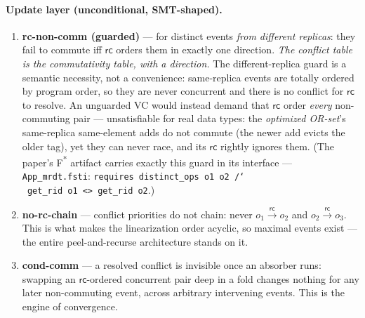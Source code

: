 \documentclass[11pt]{article}
\newcommand{\rc}{\xrightarrow{\mathsf{rc}}}
\newcommand{\lean}[1]{\texttt{#1}}
\begin{document}
\paragraph{Update layer (unconditional, SMT-shaped).}
\begin{enumerate}[leftmargin=2.2em]
\item \textbf{rc-non-comm (guarded)} --- for distinct events \emph{from
  different replicas}: they fail to commute iff $\mathsf{rc}$ orders them
  in exactly one direction. \emph{The conflict table is the commutativity
  table, with a direction.} The different-replica guard is a semantic
  necessity, not a convenience: same-replica events are totally ordered
  by program order, so they are never concurrent and there is no
  conflict for $\mathsf{rc}$ to resolve. An unguarded VC would instead
  demand that $\mathsf{rc}$ order \emph{every} non-commuting pair ---
  unsatisfiable for real data types: the \emph{optimized OR-set}'s
  same-replica same-element adds do not commute (the newer add evicts
  the older tag), yet they can never race, and its $\mathsf{rc}$
  rightly ignores them. (The paper's F\textsuperscript{*} artifact
  carries exactly this guard in its interface ---
  \lean{App\_mrdt.fsti}: \texttt{requires distinct\_ops o1 o2
  /\char`\\\ get\_rid o1 <> get\_rid o2}.)
\item \textbf{no-rc-chain} --- conflict priorities do not chain: never
  $o_1 \rc o_2$ and $o_2 \rc o_3$. This is what makes the linearization
  order acyclic, so maximal events exist --- the entire peel-and-recurse
  architecture stands on it.
\item \textbf{cond-comm} --- a resolved conflict is invisible once an
  absorber runs: swapping an $\mathsf{rc}$-ordered concurrent pair deep in
  a fold changes nothing for any later non-commuting event, across
  arbitrary intervening events. This is the engine of convergence.
\end{enumerate}
\end{document}
